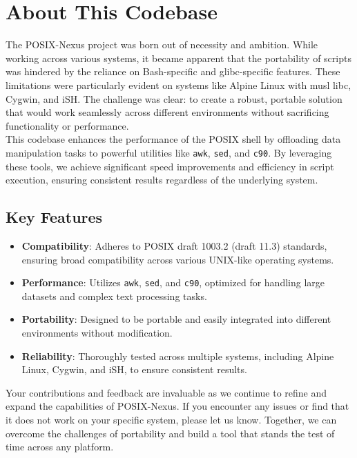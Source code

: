 \section{About This Codebase}
The POSIX-Nexus project was born out of necessity and ambition. While working across various systems, it became apparent that the portability of scripts was hindered by the reliance on Bash-specific and glibc-specific features. These limitations were particularly evident on systems like Alpine Linux with musl libc, Cygwin, and iSH. The challenge was clear: to create a robust, portable solution that would work seamlessly across different environments without sacrificing functionality or performance.
\\
This codebase enhances the performance of the POSIX shell by offloading data manipulation tasks to powerful utilities like \texttt{awk}, \texttt{sed}, and \texttt{c90}. By leveraging these tools, we achieve significant speed improvements and efficiency in script execution, ensuring consistent results regardless of the underlying system.
\\
\subsection{Key Features}
\begin{itemize}
    \item \textbf{Compatibility}: Adheres to POSIX draft 1003.2 (draft 11.3) standards, ensuring broad compatibility across various UNIX-like operating systems.
    \item \textbf{Performance}: Utilizes \texttt{awk}, \texttt{sed}, and \texttt{c90}, optimized for handling large datasets and complex text processing tasks.
    \item \textbf{Portability}: Designed to be portable and easily integrated into different environments without modification.
    \item \textbf{Reliability}: Thoroughly tested across multiple systems, including Alpine Linux, Cygwin, and iSH, to ensure consistent results.
\end{itemize}

Your contributions and feedback are invaluable as we continue to refine and expand the capabilities of POSIX-Nexus. If you encounter any issues or find that it does not work on your specific system, please let us know. Together, we can overcome the challenges of portability and build a tool that stands the test of time across any platform.
\newpage